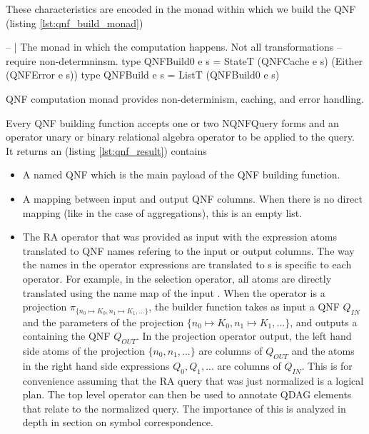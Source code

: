 These characteristics are encoded in the monad within which we build
the QNF (listing \ref{lst:qnf_build_monad})

\begin{code}
  \begin{haskellcode}
    -- | The monad in which the computation happens. Not all transformations
    -- require non-determninsm.
    type QNFBuild0 e s = StateT (QNFCache e s) (Either (QNFError e s))
    type QNFBuild e s = ListT (QNFBuild0 e s)
  \end{haskellcode}
  \label{lst:qnf_build_monad}
  \caption{QNF computation monad provides non-determinism, caching,
    and error handling.}
\end{code}

Every QNF building function accepts one or two {NQNFQuery} forms and an
operator unary or binary relational algebra operator to be applied to the query.
It returns an  (listing \ref{lst:qnf_result}) contains

\begin{itemize}
\item A  named QNF which is the main payload of the QNF building function.
\item A mapping between input and output QNF columns. When there is no direct mapping 
 (like in the case of aggregations), this is an empty list.
\item The RA operator that was provided as input with the expression atoms 
  translated to QNF names
  refering to the input or output columns. The way the names in the operator expressions are translated to
  s is specific to each operator. For example, 
  in the selection operator, all atoms are directly translated
  using the name map of the input . When the operator is a
  projection \(\pi_{\{n_0 \mapsto K_0, n_1 \mapsto K_1, ...\}}\), the
  builder function takes as input a QNF \(Q_{IN}\) and the parameters of the projection
  \(\{n_0 \mapsto K_0, n_1 \mapsto K_1, ...\}\), and outputs a  containing the
  QNF \(Q_{OUT}\). 
  In the projection operator output, the left hand side atoms of the projection \(\{n_0, n_1, ...\}\) are
  columns of \(Q_{OUT}\) and the atoms in the right hand side expressions \(Q_0,Q_1,...\) are columns of \(Q_{IN}\).
  This is for convenience assuming that the RA
  query that was just normalized is a logical plan. The top level
  operator can then be used to annotate QDAG elements that relate to
  the normalized query. The importance of this is analyzed in depth in
  section \label{sel:symbol_correspondence} on symbol correspondence.

\end{itemize}

